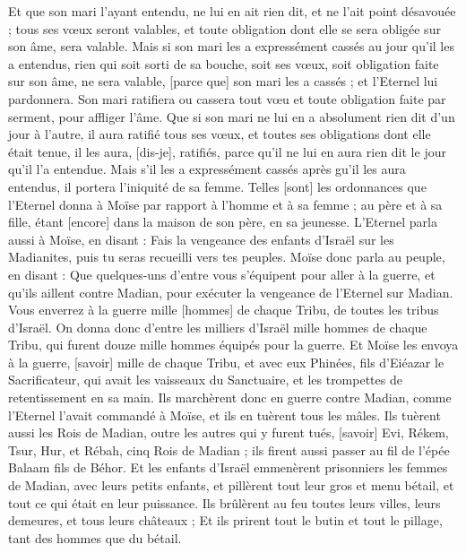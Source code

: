\begin{multicols}{2}
Et que son mari l'ayant entendu, ne lui en ait rien dit, et ne l'ait point désavouée ; tous ses vœux seront valables, et toute obligation dont elle se sera obligée sur son âme, sera valable.
Mais si son mari les a expressément cassés au jour qu'il les a entendus, rien qui soit sorti de sa bouche, soit ses vœux, soit obligation faite sur son âme, ne sera valable, [parce que] son mari les a cassés ; et l'Eternel lui pardonnera.
Son mari ratifiera ou cassera tout vœu et toute obligation faite par serment, pour affliger l'âme.
Que si son mari ne lui en a absolument rien dit d'un jour à l'autre, il aura ratifié tous ses vœux, et toutes ses obligations dont elle était tenue, il les aura, [dis-je], ratifiés, parce qu'il ne lui en aura rien dit le jour qu'il l'a entendue.
Mais s'il les a expressément cassés après gu'il les aura entendus, il portera l'iniquité de sa femme.
Telles [sont] les ordonnances que l'Eternel donna à Moïse par rapport à l'homme et à sa femme ; au père et à sa fille, étant [encore] dans la maison de son père, en sa jeunesse.
\VerseOne{}L'Eternel parla aussi à Moïse, en disant :
Fais la vengeance des enfants d'Israël sur les Madianites, puis tu seras recueilli vers tes peuples.
Moïse donc parla au peuple, en disant : Que quelques-uns d'entre vous s'équipent pour aller à la guerre, et qu'ils aillent contre Madian, pour exécuter la vengeance de l'Eternel sur Madian.
Vous enverrez à la guerre mille [hommes] de chaque Tribu, de toutes les tribus d'Israël.
On donna donc d'entre les milliers d'Israël mille hommes de chaque Tribu, qui furent douze mille hommes équipés pour la guerre.
Et Moïse les envoya à la guerre, [savoir] mille de chaque Tribu, et avec eux Phinées, fils d'Eiéazar le Sacrificateur, qui avait les vaisseaux du Sanctuaire, et les trompettes de retentissement en sa main.
Ils marchèrent donc en guerre contre Madian, comme l'Eternel l'avait commandé à Moïse, et ils en tuèrent tous les mâles.
Ils tuèrent aussi les Rois de Madian, outre les autres qui y furent tués, [savoir] Evi, Rékem, Tsur, Hur, et Rébah, cinq Rois de Madian ; ils firent aussi passer au fil de l'épée Balaam fils de Béhor.
Et les enfants d'Israël emmenèrent prisonniers les femmes de Madian, avec leurs petits enfants, et pillèrent tout leur gros et menu bétail, et tout ce qui était en leur puissance.
Ils brûlèrent au feu toutes leurs villes, leurs demeures, et tous leurs châteaux ;
Et ils prirent tout le butin et tout le pillage, tant des hommes que du bétail.

\end{multicols}
